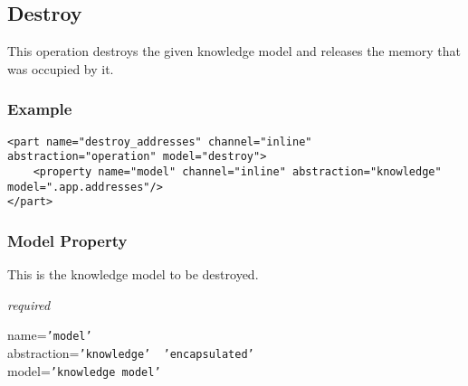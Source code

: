 %
%
%
%
%
%

\subsection{Destroy}
\label{destroy_heading}

This operation destroys the given knowledge model and releases the memory that
was occupied by it.

\subsubsection{Example}

\begin{scriptsize}
    \begin{verbatim}
<part name="destroy_addresses" channel="inline" abstraction="operation" model="destroy">
    <property name="model" channel="inline" abstraction="knowledge" model=".app.addresses"/>
</part>
    \end{verbatim}
\end{scriptsize}

\subsubsection{Model Property}

This is the knowledge model to be destroyed.

\emph{required}

name=\texttt{'model'}\\
abstraction=\texttt{'knowledge' \vline\ 'encapsulated'}\\
model=\texttt{'knowledge model'}
